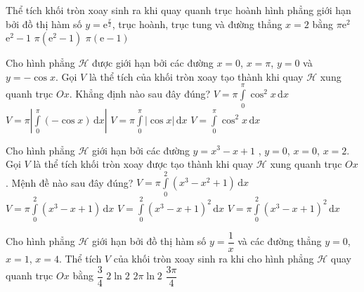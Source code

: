 \begin{ex}%
Thể tích khối tròn xoay sinh ra khi quay quanh trục hoành hình phẳng giới hạn bởi đồ thị hàm số $y=\mathrm{e}^{\frac{x}{2}}$, trục hoành, trục tung và đường thẳng $x=2$ bằng
\choice
{$\pi{\mathrm{e}^2}$}
{$\mathrm{e}^2-1$}
{\True $\pi\left(\mathrm{e}^2-1\right)$}
{$\pi\left(\mathrm{e}-1\right)$}
\end{ex}

\begin{ex}%
Cho hình phẳng $\mathscr{H}$ được giới hạn bởi các đường $x=0$, $x=\pi $, $y=0$ và $y=-\cos x$. Gọi  $V$ là thể tích của khối tròn xoay tạo thành khi quay $\mathscr{H}$ xung quanh trục $Ox$. Khẳng định nào sau đây đúng?
\choice
{\True $V=\pi\displaystyle\int\limits_0^\pi \cos^2x\mathrm{\,d}x$}
{$V=\pi\left|\displaystyle\int\limits_0^\pi\left(-\cos x\right)\mathrm{\,d}x\right|$}
{$V=\pi\displaystyle\int\limits_0^\pi\left|\cos x\right|\mathrm{\,d}x$}
{$V=\displaystyle\int\limits_0^\pi\cos^2x\mathrm{\,d}x$}
\end{ex}

\begin{ex}%
Cho hình phẳng $\mathscr{H}$ giới hạn bởi các đường $y=x^3-x+1$ , $y=0$, $x=0$, $x=2$. Gọi $V$ là thể tích khối tròn xoay được tạo thành khi quay $\mathscr{H}$ xung quanh trục $Ox$. Mệnh đề nào sau đây đúng?
\choice
{$V=\pi\displaystyle\int\limits_0^2\left(x^3-x^2+1\right)\mathrm{\,d}x$}
{$V=\pi\displaystyle\int\limits_0^2\left(x^3-x+1\right)\mathrm{\,d}x$}
{$V=\displaystyle\int\limits_0^2\left(x^3-x+1\right)^2\mathrm{\,d}x$}
{\True $V=\pi\displaystyle\int\limits_0^2\left(x^3-x+1\right)^2\mathrm{\,d}x$}
\end{ex}

\begin{ex}%
Cho hình phẳng $\mathscr{H}$ giới hạn bởi đồ thị hàm số $y=\dfrac{1}{x}$ và các đường thẳng $y=0$, $x=1$, $x=4$. Thể tích $V$ của khối tròn xoay sinh ra khi cho hình phẳng $\mathscr{H}$ quay quanh trục $Ox$ bằng
\choice
{$\dfrac{3}{4}$}
{$2\ln 2$}
{$2\pi\ln 2$}
{\True $\dfrac{3\pi}{4}$}
\end{ex}

